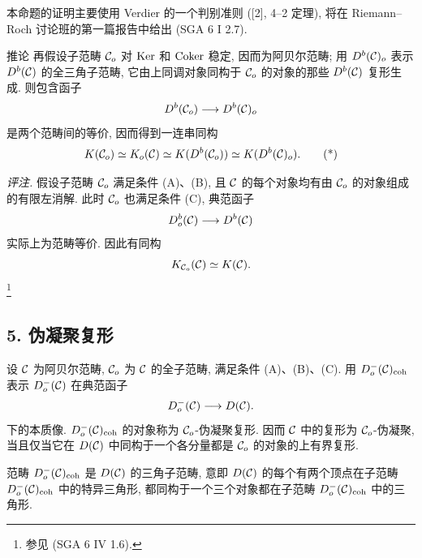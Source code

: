 本命题的证明主要使用 Verdier 的一个判别准则 ([2], 4--2 定理), 将在 Riemann--Roch 讨论班的第一篇报告中给出 (SGA 6 I 2.7).

\begin{statement}{推论}
再假设子范畴 $\mathcal C_o$ 对 $\operatorname{Ker}$ 和 $\operatorname{Coker}$ 稳定, 因而为阿贝尔范畴; 用 $D^b(\mathcal C)_o$ 表示 $D^b(\mathcal C)$ 的全三角子范畴, 它由上同调对象同构于 $\mathcal C_o$ 的对象的那些 $D^b(\mathcal C)$ 复形生成. 则包含函子
\[
D^b(\mathcal C_o)\longrightarrow D^b(\mathcal C)_o
\]
是两个范畴间的等价, 因而得到一连串同构
\[
K(\mathcal C_o)\simeq K_o(\mathcal C)\simeq K(D^b(\mathcal C_o))\simeq K(D^b(\mathcal C)_o).
\tag{*}
\]
\end{statement}

\emph{评注.} 假设子范畴 $\mathcal C_o$ 满足条件 (A)、(B), 且 $\mathcal C$ 的每个对象均有由 $\mathcal C_o$ 的对象组成的有限左消解. 此时 $\mathcal C_o$ 也满足条件 (C), 典范函子
\[
D_o^b(\mathcal C)\longrightarrow D^b(\mathcal C)
\]
实际上为范畴等价. 因此有同构
\[
K_{\mathcal C_o}(\mathcal C)\simeq K(\mathcal C).
\]
\footnote{参见 (SGA 6 IV 1.6).}

\subsection*{5. 伪凝聚复形}

设 $\mathcal C$ 为阿贝尔范畴, $\mathcal C_o$ 为 $\mathcal C$ 的全子范畴, 满足条件 (A)、(B)、(C). 用 $D_o^-(\mathcal C)_{\mathrm{coh}}$ 表示 $D_o^-(\mathcal C)$ 在典范函子
\[
D_o^-(\mathcal C)\longrightarrow D(\mathcal C).
\]
下的本质像. $D_o^-(\mathcal C)_{\mathrm{coh}}$ 的对象称为 $\mathcal C_o$-伪凝聚复形. 因而 $\mathcal C$ 中的复形为 $\mathcal C_o$-伪凝聚, 当且仅当它在 $D(\mathcal C)$ 中同构于一个各分量都是 $\mathcal C_o$ 的对象的上有界复形.

范畴 $D_o^-(\mathcal C)_{\mathrm{coh}}$ 是 $D(\mathcal C)$ 的三角子范畴, 意即 $D(\mathcal C)$ 的每个有两个顶点在子范畴 $D_o^-(\mathcal C)_{\mathrm{coh}}$ 中的特异三角形, 都同构于一个三个对象都在子范畴 $D_o^-(\mathcal C)_{\mathrm{coh}}$ 中的三角形.

